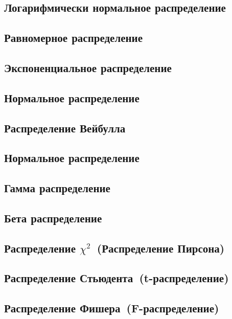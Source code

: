 \documentclass[]{scrartcl}
\begin{document}
\subsection{Логарифмически нормальное распределение}

\subsection{Равномерное распределение}

\subsection{Экспоненциальное распределение}

\subsection{Нормальное распределение}

\subsection{Распределение Вейбулла}

\subsection{Нормальное распределение}

\subsection{Гамма распределение}

\subsection{Бета распределение}

\subsection{Распределение $\chi^{2}$~(Распределение Пирсона)}

\subsection{Распределение Стьюдента~(t-распределение)}

\subsection{Распределение Фишера~(F-распределение)}
\end{document}

